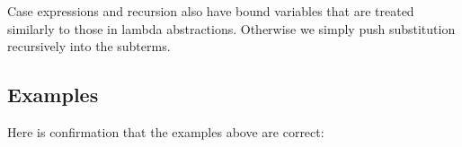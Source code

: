Case expressions and recursion also have bound variables that are
treated similarly to those in lambda abstractions. Otherwise we simply
push substitution recursively into the subterms.

\hypertarget{examples}{%
\subsection{Examples}\label{examples}}

Here is confirmation that the examples above are correct:

\begin{fence}
\begin{code}%
\>[0]\AgdaFunction{\AgdaUnderscore{}}\AgdaSpace{}%
\AgdaSymbol{:}\AgdaSpace{}%
\AgdaSymbol{(}\AgdaSpace{}%
\AgdaSpace{}%
\AgdaSpace{}%
\AgdaSpace{}%
\AgdaSpace{}%
\AgdaSpace{}%
\AgdaSymbol{(}\AgdaSpace{}%
\AgdaSpace{}%
\AgdaSpace{}%
\AgdaSpace{}%
\AgdaSymbol{))}\AgdaSpace{}%
\AgdaOperator{\AgdaFunction{[}}\AgdaSpace{}%
\AgdaSpace{}%
\AgdaOperator{\AgdaFunction{:=}}\AgdaSpace{}%
\AgdaSpace{}%
\AgdaOperator{\AgdaFunction{]}}\AgdaSpace{}%
\AgdaSpace{}%
\AgdaSpace{}%
\AgdaSpace{}%
\AgdaSpace{}%
\AgdaSpace{}%
\AgdaSpace{}%
\AgdaSymbol{(}\AgdaSpace{}%
\AgdaSpace{}%
\AgdaSpace{}%
\AgdaSymbol{)}\<%
\\
\>[0]\AgdaSymbol{\AgdaUnderscore{}}\AgdaSpace{}%
\AgdaSymbol{=}\AgdaSpace{}%
\<%
\\
%
\\[\AgdaEmptyExtraSkip]%
\>[0]\AgdaFunction{\AgdaUnderscore{}}\AgdaSpace{}%
\AgdaSymbol{:}\AgdaSpace{}%
\AgdaSymbol{(}\AgdaSpace{}%
\AgdaSpace{}%
\AgdaSymbol{(}\AgdaSpace{}%
\AgdaSpace{}%
\AgdaSpace{}%

\end{code}
\end{fence}
